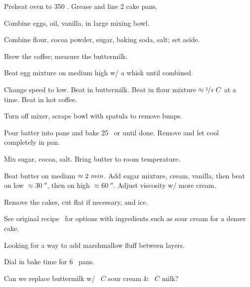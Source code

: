 \begin{preparation}
\item Preheat oven to 350 \Fahrenheit.
	Grease and line 2 cake pans.

\item Combine eggs, oil, vanilla, in large mixing bowl.

\item Combine flour, cocoa powder, sugar, baking soda, salt; set aside.

\item Brew the coffee; measure the buttermilk.

\item Beat egg mixture on medium high w/ a whisk until combined.

\item Change speed to low.
	Beat in buttermilk.
	Beat in flour mixture $\approx \onefourth~C$ at a time.
	Beat in hot coffee.

\item Turn off mixer, scrape bowl with spatula to remove lumps.

\item Pour batter into pans and bake 25 \minute~or until done.
	Remove and let cool completely in pan.

\item Mix sugar, cocoa, salt.
	Bring butter to room temperature.

\item Beat butter on medium $\approx2~\minute$.
	Add sugar mixture, cream, vanilla, then beat on low $\approx 30~\second$, then on high $\approx 60~\second$.
	Adjust viscosity w/ more cream.

\item Remove the cakes, cut flat if necessary, and ice.
\end{preparation}


\begin{variation}
\item See original recipe~\cite{sallyTripleChoc2020} for options with ingredients such as sour cream for a denser cake.
\end{variation}


\begin{experiments}
\item Looking for a way to add marshmallow fluff between layers.

\item Dial in bake time for 6 \inch~pans.

\item Can we replace buttermilk w/ \threefourth~$C$ sour cream \& \onefourth~$C$ milk?
\end{experiments}


\recipeend%
